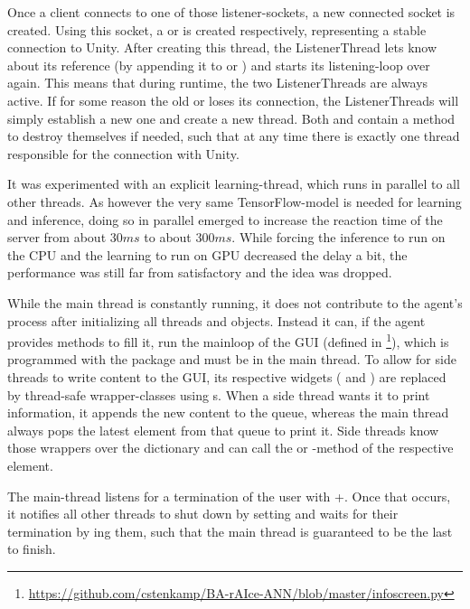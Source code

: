 Once a client connects to one of those listener-sockets, a new connected socket is created. Using this socket, a  or  is created respectively, representing a stable connection to Unity. After creating this thread, the ListenerThread lets  know about its reference (by appending it to  or ) and starts its listening-loop over again. This means that during runtime, the two ListenerThreads are always active. If for some reason the old  or  loses its connection, the ListenerThreads will simply establish a new one and create a new thread. Both  and   contain a method to destroy themselves if needed, such that at any time there is exactly one thread responsible for the connection with Unity.

It was experimented with an explicit learning-thread, which runs in parallel to all other threads. As however the very same TensorFlow-model is needed for learning and inference, doing so in parallel emerged to increase the reaction time of the server from about $30ms$ to about $300ms$. While forcing the inference to run on the CPU and the learning to run on GPU decreased the delay a bit, the performance was still far from satisfactory and the idea was dropped.

While the main thread is constantly running, it does not contribute to the agent's process after initializing all threads and objects. Instead it can, if the agent provides methods to fill it, run the mainloop of the GUI (defined in \footnote{\url{https://github.com/cstenkamp/BA-rAIce-ANN/blob/master/infoscreen.py}}), which is programmed with the package  and must be in the main thread. To allow for side threads to write content to the GUI, its respective widgets ( and ) are replaced by thread-safe wrapper-classes using s. When a side thread wants it to print information, it appends the new content to the queue, whereas the main thread always pops the latest element from that queue to print it. Side threads know those wrappers over the dictionary  and can call the  or -method of the respective element.

The main-thread listens for a termination of the user with +. Once that occurs, it notifies all other threads to shut down by setting  and waits for their termination by ing them, such that the main thread is guaranteed to be the last to finish.

